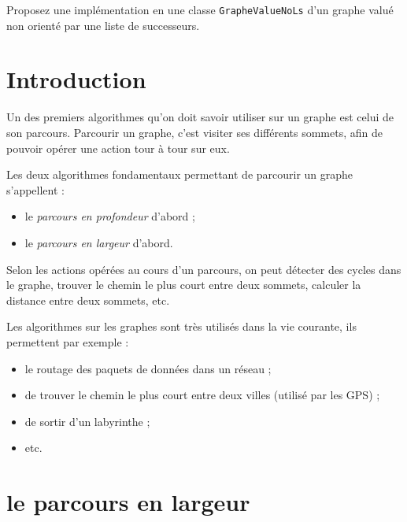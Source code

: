 \documentclass[12pt]{book}
\begin{document}
\Quest Proposez une implémentation en une classe
\texttt{GrapheValueNoLs} d'un graphe valué non orienté par une liste de
successeurs.


\section{Introduction}\label{introduction}

Un des premiers algorithmes qu'on doit savoir utiliser sur un graphe est
celui de son parcours. Parcourir un graphe, c'est visiter ses différents
sommets, afin de pouvoir opérer une action tour à tour sur eux.

Les deux algorithmes fondamentaux permettant de parcourir un graphe
s'appellent :

\begin{itemize}
\tightlist
\item
  le \emph{parcours en profondeur} d'abord ;
\item
  le \emph{parcours en largeur} d'abord.
\end{itemize}

Selon les actions opérées au cours d'un parcours, on peut détecter des
cycles dans le graphe, trouver le chemin le plus court entre deux
sommets, calculer la distance entre deux sommets, etc.

Les algorithmes sur les graphes sont très utilisés dans la vie courante,
ils permettent par exemple :

\begin{itemize}
\tightlist
\item
  le routage des paquets de données dans un réseau ;
\item
  de trouver le chemin le plus court entre deux villes (utilisé par les
  GPS) ;
\item
  de sortir d'un labyrinthe ;
\item
  etc.
\end{itemize}

\section{le parcours en largeur}

\end{document}
